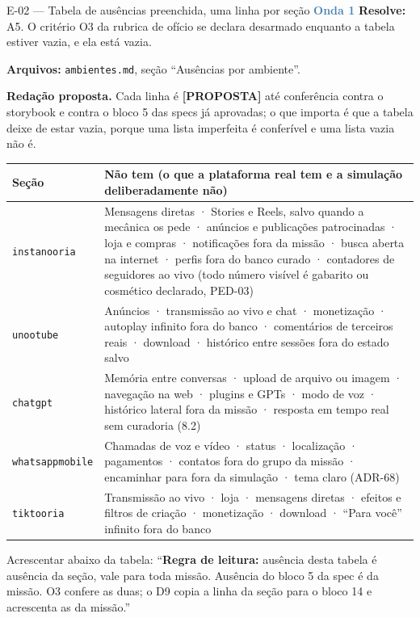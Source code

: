 \documentclass[11pt,a4paper]{article}
\newcommand{\onda}[1]{\textcolor{SteelBlue}{\textbf{Onda #1}}}
\begin{document}
\begin{emendabox}{E-02 --- Tabela de ausências preenchida, uma linha por seção \hfill \onda{1}}
\textbf{Resolve:} A5. O critério O3 da rubrica de ofício se declara desarmado enquanto a tabela
estiver vazia, e ela está vazia.

\textbf{Arquivos:} \texttt{ambientes.md}, seção ``Ausências por ambiente''.

\textbf{Redação proposta.} Cada linha é \textbf{[PROPOSTA]} até conferência contra o storybook e
contra o bloco 5 das specs já aprovadas; o que importa é que a tabela deixe de estar vazia, porque
uma lista imperfeita é conferível e uma lista vazia não é.

\begin{center}\small
\begin{tabular}{@{}p{2.6cm} p{12.2cm}@{}}
\toprule
\textbf{Seção} & \textbf{Não tem (o que a plataforma real tem e a simulação deliberadamente não)} \\
\midrule
\texttt{instanooria} & Mensagens diretas · Stories e Reels, salvo quando a mecânica os pede ·
anúncios e publicações patrocinadas · loja e compras · notificações fora da missão · busca aberta
na internet · perfis fora do banco curado · contadores de seguidores ao vivo (todo número visível é
gabarito ou cosmético declarado, PED-03) \\
\texttt{unootube} & Anúncios · transmissão ao vivo e chat · monetização · autoplay infinito fora do
banco · comentários de terceiros reais · download · histórico entre sessões fora do estado salvo \\
\texttt{chatgpt} & Memória entre conversas · upload de arquivo ou imagem · navegação na web ·
plugins e GPTs · modo de voz · histórico lateral fora da missão · resposta em tempo real sem
curadoria (8.2) \\
\texttt{whatsappmobile} & Chamadas de voz e vídeo · status · localização · pagamentos · contatos
fora do grupo da missão · encaminhar para fora da simulação · tema claro (ADR-68) \\
\texttt{tiktooria} & Transmissão ao vivo · loja · mensagens diretas · efeitos e filtros de criação
· monetização · download · ``Para você'' infinito fora do banco \\
\bottomrule
\end{tabular}
\end{center}

Acrescentar abaixo da tabela: ``\textbf{Regra de leitura:} ausência desta tabela é ausência da
seção, vale para toda missão. Ausência do bloco 5 da spec é da missão. O3 confere as duas; o D9
copia a linha da seção para o bloco 14 e acrescenta as da missão.''


\end{emendabox}
\end{document}
